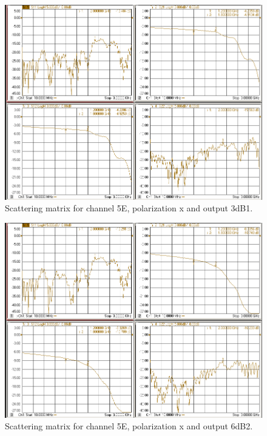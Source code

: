 \documentclass[12pt,a4paper,oneside]{article}
\begin{document}
\begin{figure}[H]
\centering
\includegraphics[width=0.9\linewidth]{VNA_results/5Ex_3dB1.png}
\caption{Scattering matrix for channel 5E, polarization x and output 3dB1.}
\label{fig:5Ex_3dB1}
\end{figure}


\begin{figure}[H]
\centering
\includegraphics[width=0.9\linewidth]{VNA_results/5Ex_6dB2.png}
\caption{Scattering matrix for channel 5E, polarization x and output 6dB2.}
\label{fig:5Ex_6dB2}
\end{figure}
\end{document}
